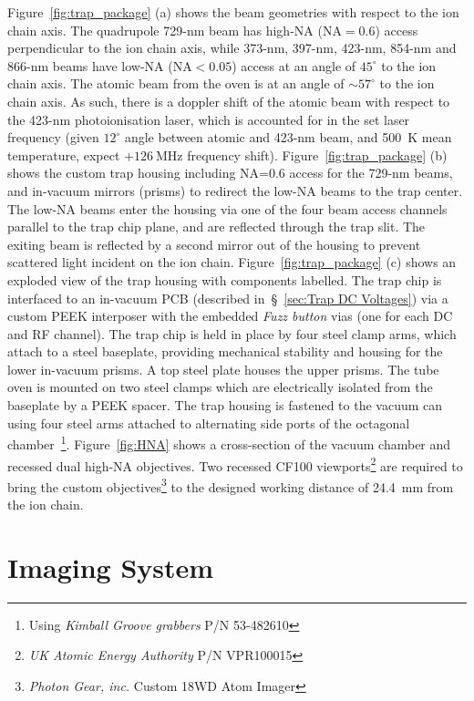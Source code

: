     Figure~\ref{fig:trap_package} (a) shows the beam geometries with respect
    to the ion chain axis. The quadrupole 729-nm beam has high-NA ($\mathrm{NA}=0.6$) access
    perpendicular to the ion chain axis, while 373-nm, 397-nm, 423-nm, 854-nm and 866-nm
    beams have low-NA ($\mathrm{NA}<0.05$) access at an angle of $45^{\circ}$ to the ion chain axis.
    The atomic beam from the oven is at an angle of $\sim 57^{\circ}$ to the ion
    chain axis. As such, there is a doppler shift of the atomic beam with
    respect to the 423-nm photoionisation laser, which is accounted for in the
    set laser frequency (given $12^\circ$ angle between atomic and 423-nm
    beam, and 500~K mean temperature, expect $+126~\unit{\mega\hertz}$ frequency
    shift). Figure~\ref{fig:trap_package} (b) shows the custom trap housing including NA=0.6 access for the 729-nm beams, and in-vacuum mirrors (prisms) to redirect the low-NA beams to the trap center. The low-NA beams enter the housing via one of the four beam access channels parallel to the trap chip plane, and are reflected through the trap slit. The exiting beam is reflected by a second mirror out of the housing to prevent scattered light incident on the ion chain.
    Figure~\ref{fig:trap_package} (c) shows an exploded view of the trap housing with components labelled. The trap chip is interfaced to an in-vacuum PCB (described in~\S~\ref{sec:Trap DC Voltages}) via a custom PEEK interposer with the embedded \emph{Fuzz button} vias (one for each DC and RF channel). 
    The trap chip is held in place by four steel clamp arms, which attach to a
    steel baseplate, providing mechanical stability and housing for the lower
    in-vacuum prisms. 
    A top steel plate houses the upper prisms. The tube oven
    is mounted on two steel clamps which are electrically isolated from the baseplate by a PEEK spacer. The trap housing is fastened to the vacuum can using four
    steel arms attached to alternating side ports of the octagonal
    chamber~\footnote{Using \emph{Kimball Groove grabbers} P/N 53-482610}.
    Figure~\ref{fig:HNA} shows a cross-section of the vacuum chamber and
    recessed dual high-NA objectives. 
    Two recessed CF100 viewports\footnote{\emph{UK Atomic
    Energy Authority} P/N VPR100015} are required to bring the custom objectives\footnote{\emph{Photon Gear, inc.} Custom 18WD Atom Imager} to the designed working distance of 24.4~mm from the ion chain. 

\section{Imaging System}
\label{sec:Imaging System}

